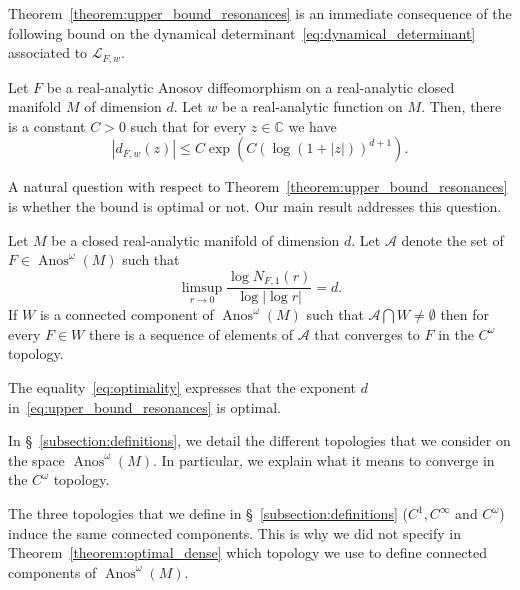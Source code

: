 \documentclass[AHL,Unicode,longabstracts,published]{cedram}
\DeclareMathOperator{\Anos}{Anos}
\newcommand{\p}[1]{\left(#1\right)}
\newcommand{\va}[1]{\left|#1\right|}
\newcommand{\clL}{\mathcal{L}}
\newcommand{\clA}{\mathcal{A}}
\newcommand{\bbC}{\mathbb{C}}
\begin{document}
Theorem~\ref{theorem:upper_bound_resonances} is an immediate consequence of the following bound on the dynamical determinant~\eqref{eq:dynamical_determinant} associated to $\clL_{F,w}$.

\begin{theo}\label{thm:upper_bound_determinant}
Let $F$ be a real-analytic Anosov diffeomorphism on a real-analytic closed manifold $M$ of dimension $d$. Let $w$ be a real-analytic function on $M$. Then, there is a constant $C > 0$ such that for every $z \in \bbC$ we have
\begin{equation*}
\va{d_{F,w}(z)} \leq C \exp\p{C\p{\log(1 + \va{z})}^{d+1}}.
\end{equation*}
\end{theo}

A natural question with respect to Theorem~\ref{theorem:upper_bound_resonances} is whether the bound is optimal or not. Our main result addresses this question.

\begin{theo}\label{theorem:optimal_dense}
Let $M$ be a closed real-analytic manifold of dimension $d$. Let $\clA$ denote the set of $F \in \Anos^\omega(M)$ such that
\begin{equation}\label{eq:optimality}
\limsup_{r \to 0} \frac{\log N_{F,1}(r)}{\log \va{\log r}} = d.
\end{equation}
If $W$ is a connected component of $\Anos^\omega(M)$ such that $\clA\bigcap W \neq \emptyset$ then for every $F \in W$ there is a sequence of elements of $\clA$ that converges to $F$ in the $C^\omega$ topology.
\end{theo}

\begin{rema}
The equality~\eqref{eq:optimality} expresses that the exponent $d$ in~\eqref{eq:upper_bound_resonances} is optimal.
\end{rema}

\begin{rema}
In \S~\ref{subsection:definitions}, we detail the different topologies that we consider on the space $\Anos^\omega(M)$. In particular, we explain what it means to converge in the $C^\omega$ topology.

The three topologies that we define in \S~\ref{subsection:definitions} ($C^1,C^\infty$ and $C^\omega$) induce the same connected components. This is why we did not specify in Theorem~\ref{theorem:optimal_dense} which topology we use to define connected components of $\Anos^\omega(M)$.
\end{rema}
\end{document}
